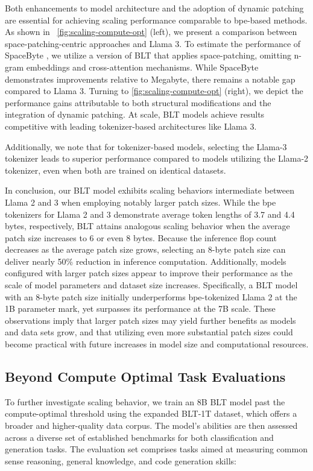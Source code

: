 Both enhancements to model architecture and the adoption of dynamic patching are essential for achieving scaling performance comparable to bpe-based methods. As shown in ~\autoref{fig:scaling-compute-opt} (left), we present a comparison between space-patching-centric approaches and Llama 3. To estimate the performance of SpaceByte \citep{slagle2024spacebyte}, we utilize a version of {\textsc BLT} that applies space-patching, omitting n-gram embeddings and cross-attention mechanisms. While SpaceByte demonstrates improvements relative to Megabyte, there remains a notable gap compared to Llama 3. Turning to \autoref{fig:scaling-compute-opt} (right), we depict the performance gains attributable to both structural modifications and the integration of dynamic patching. At scale, {\textsc BLT} models achieve results competitive with leading tokenizer-based architectures like Llama 3.

Additionally, we note that for tokenizer-based models, selecting the Llama-3 tokenizer leads to superior performance compared to models utilizing the Llama-2 tokenizer, even when both are trained on identical datasets.

In conclusion, our {\textsc BLT} model exhibits scaling behaviors intermediate between Llama 2 and 3 when employing notably larger patch sizes. While the bpe tokenizers for Llama 2 and 3 demonstrate average token lengths of 3.7 and 4.4 bytes, respectively, {\textsc BLT} attains analogous scaling behavior when the average patch size increases to 6 or even 8 bytes. Because the inference flop count decreases as the average patch size grows, selecting an 8-byte patch size can deliver nearly 50\% reduction in inference computation. Additionally, models configured with larger patch sizes appear to improve their performance as the scale of model parameters and dataset size increases. Specifically, a {\textsc BLT} model with an 8-byte patch size initially underperforms bpe-tokenized Llama 2 at the 1B parameter mark, yet surpasses its performance at the 7B scale. These observations imply that larger patch sizes may yield further benefits as models and data sets grow, and that utilizing even more substantial patch sizes could become practical with future increases in model size and computational resources.

\subsection{Beyond Compute Optimal Task Evaluations}
\label{section:evals}
To further investigate scaling behavior, we train an 8B {\textsc BLT} model past the compute-optimal threshold using the expanded {\textsc BLT}-1T dataset, which offers a broader and higher-quality data corpus. The model’s abilities are then assessed across a diverse set of established benchmarks for both classification and generation tasks. The evaluation set comprises tasks aimed at measuring common sense reasoning, general knowledge, and code generation skills:
